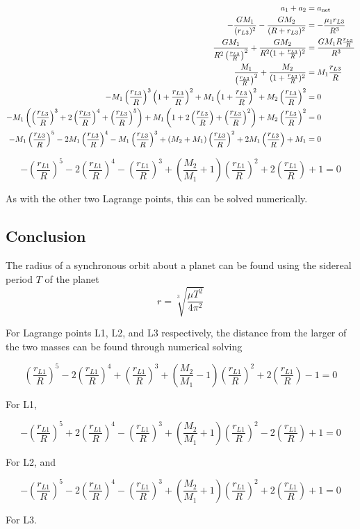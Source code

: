 \documentclass[../basicOrbitalDynamics.tex]{subfiles}
\begin{document}
\begin{align*}
    a_1+a_2   & ={a}_\text{net}\\
    -\frac{GM_1}{(r_{L3})^2}-\frac{GM_2}{(R+r_{L3})^2}& = -\frac{\mu_1 r_{L3}}{R^3}\\
    \frac{GM_1}{R^2\left(\frac{r_{L3}}{R}\right)^2}+\frac{GM_2}{R^2(1+\frac{r_{L3}}{R})^2}    & = \frac{GM_1 R\frac{r_{L3}}{R}}{R^3} \\
    \frac{M_1}{\left(\frac{r_{L3}}{R}\right)^2}+\frac{M_2}{(1+\frac{r_{L3}}{R})^2}  & = M_1\frac{r_{L3}}{R} \\
    -M_1\left(\frac{r_{L3}}{R}\right)^3\left(1+\frac{r_{L3}}{R}\right)^2+M_1\left(1+\frac{r_{L3}}{R}\right)^2+M_2\left(\frac{r_{L3}}{R}\right)^2& = 0    \\
    -M_1\left(\left(\frac{r_{L3}}{R}\right)^3+2\left(\frac{r_{L3}}{R}\right)^4+\left(\frac{r_{L3}}{R}\right)^5\right)+M_1\left(1+2\left(\frac{r_{L3}}{R}\right)+\left(\frac{r_{L3}}{R}\right)^2\right)+M_2\left(\frac{r_{L3}}{R}\right)^2 & = 0    \\
    -M_1\left(\frac{r_{L3}}{R}\right)^5-2M_1\left(\frac{r_{L3}}{R}\right)^4-M_1\left(\frac{r_{L3}}{R}\right)^3+(M_2+M_1)\left(\frac{r_{L3}}{R}\right)^2+2M_1\left(\frac{r_{L3}}{R}\right)+M_1& = 0    \\
\end{align*}

\begin{equation}\label{L3 Equation}
    -\left(\frac{r_{L1}}{R}\right)^5-2\left(\frac{r_{L1}}{R}\right)^4-\left(\frac{r_{L1}}{R}\right)^3+\left(\frac{M_2}{M_1}+1\right)\left(\frac{r_{L1}}{R}\right)^2+2\left(\frac{r_{L1}}{R}\right)+1= 0
\end{equation}

As with the other two Lagrange points, this can be solved numerically.


\bigskip\bigskip
\subsection{Conclusion}

The radius of a synchronous orbit about a planet can be found using the sidereal period $T$ of the planet
\[r=\sqrt[3]{\frac{\mu T^2}{4\pi^2}}\]

For Lagrange points L1, L2, and L3 respectively, the distance from the larger of the two masses can be found through numerical solving

\[\left(\frac{r_{L1}}{R}\right)^5-2\left(\frac{r_{L1}}{R}\right)^4+\left(\frac{r_{L1}}{R}\right)^3+\left(\frac{M_2}{M_1}-1\right)\left(\frac{r_{L1}}{R}\right)^2+2\left(\frac{r_{L1}}{R}\right)-1=0\]

For L1,

\[-\left(\frac{r_{L1}}{R}\right)^5+2\left(\frac{r_{L1}}{R}\right)^4-\left(\frac{r_{L1}}{R}\right)^3+\left(\frac{M_2}{M_1}+1\right)\left(\frac{r_{L1}}{R}\right)^2-2\left(\frac{r_{L1}}{R}\right)+1= 0\]

For L2, and

\[-\left(\frac{r_{L1}}{R}\right)^5-2\left(\frac{r_{L1}}{R}\right)^4-\left(\frac{r_{L1}}{R}\right)^3+\left(\frac{M_2}{M_1}+1\right)\left(\frac{r_{L1}}{R}\right)^2+2\left(\frac{r_{L1}}{R}\right)+1= 0\]

For L3.
\end{document}
